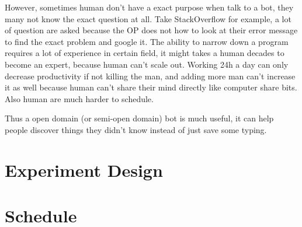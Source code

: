 \documentclass[11pt,letterpaper,twocolumn,oneside]{article}
\begin{document}
However, sometimes human don't have a exact purpose when talk to a bot, they many not know the exact question at all.
Take StackOverflow for example, a lot of question are asked because the
OP does not how to look at their error message to find the exact problem and google it.
The ability to narrow down a program requires a lot of experience in certain field,
it might takes a human decades to become an expert, because human can't scale out.
Working 24h a day can only decrease productivity if not killing the man, and adding
more man can't increase it as well because human can't share their mind directly like computer share bits.
Also human are much harder to schedule.

Thus a open domain (or semi-open domain) bot is much useful, it can help people
discover things they didn't know instead of just save some typing.


\section{Experiment Design}

\section{Schedule}

\printbibliography
\end{document}
